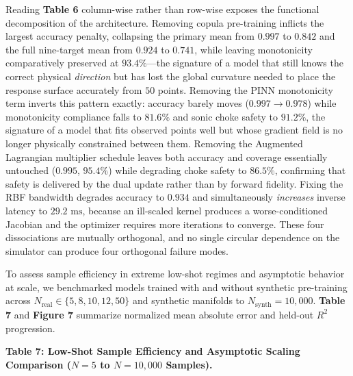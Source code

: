 \documentclass[10pt,journal,onecolumn]{IEEEtran}
\begin{document}
Reading \textbf{Table 6} column-wise rather than row-wise exposes the functional decomposition of the architecture. Removing copula pre-training inflicts the largest accuracy penalty, collapsing the primary mean from $0.997$ to $0.842$ and the full nine-target mean from $0.924$ to $0.741$, while leaving monotonicity comparatively preserved at $93.4\%$—the signature of a model that still knows the correct physical \textit{direction} but has lost the global curvature needed to place the response surface accurately from $50$ points. Removing the PINN monotonicity term inverts this pattern exactly: accuracy barely moves ($0.997 \to 0.978$) while monotonicity compliance falls to $81.6\%$ and sonic choke safety to $91.2\%$, the signature of a model that fits observed points well but whose gradient field is no longer physically constrained between them. Removing the Augmented Lagrangian multiplier schedule leaves both accuracy and coverage essentially untouched ($0.995$, $95.4\%$) while degrading choke safety to $86.5\%$, confirming that safety is delivered by the dual update rather than by forward fidelity. Fixing the RBF bandwidth degrades accuracy to $0.934$ and simultaneously \textit{increases} inverse latency to $29.2\text{ ms}$, because an ill-scaled kernel produces a worse-conditioned Jacobian and the optimizer requires more iterations to converge. These four dissociations are mutually orthogonal, and no single circular dependence on the simulator can produce four orthogonal failure modes.

To assess sample efficiency in extreme low-shot regimes and asymptotic behavior at scale, we benchmarked models trained with and without synthetic pre-training across $N_{\text{real}} \in \{5, 8, 10, 12, 50\}$ and synthetic manifolds to $N_{\text{synth}} = 10,000$. \textbf{Table 7} and \textbf{Figure 7} summarize normalized mean absolute error and held-out $R^2$ progression.

\textbf{Table 7: Low-Shot Sample Efficiency and Asymptotic Scaling Comparison ($N = 5$ to $N = 10,000$ Samples).}
\end{document}
